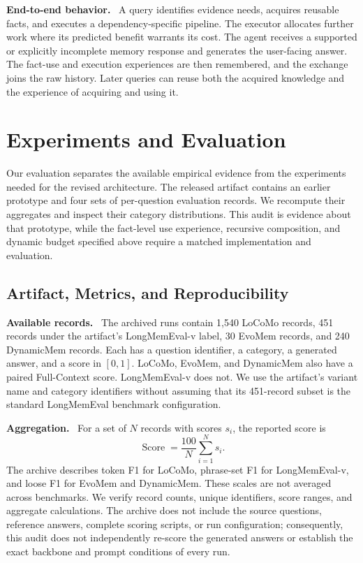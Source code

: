\documentclass[10pt,twocolumn]{article}
\newcommand{\runin}[1]{\smallskip\noindent\textbf{#1.}\ }
\begin{document}
\runin{End-to-end behavior}
A query identifies evidence needs, acquires reusable facts, and executes
a dependency-specific pipeline. The executor allocates further work
where its predicted benefit warrants its cost. The agent receives a
supported or explicitly incomplete memory response and generates the
user-facing answer. The fact-use and execution experiences are then
remembered, and the exchange joins the raw history. Later queries can
reuse both the acquired knowledge and the experience of acquiring and
using it.

\section{Experiments and Evaluation}
\label{sec:new-experiments}

Our evaluation separates the available empirical evidence from the
experiments needed for the revised architecture. The released artifact
contains an earlier prototype and four sets of per-question evaluation
records. We recompute their aggregates and inspect their category
distributions. This audit is evidence about that prototype, while the
fact-level use experience, recursive composition, and dynamic budget
specified above require a matched implementation and evaluation.

\subsection{Artifact, Metrics, and Reproducibility}
\label{subsec:new-artifact}

\runin{Available records}
The archived runs contain 1,540 LoCoMo records, 451 records under the
artifact's LongMemEval-v label, 30 EvoMem records, and 240 DynamicMem
records. Each has a question identifier, a category, a generated answer,
and a score in $[0,1]$. LoCoMo, EvoMem, and DynamicMem also have a
paired Full-Context score. LongMemEval-v does not. We use the artifact's
variant name and category identifiers without assuming that its
451-record subset is the standard LongMemEval benchmark configuration.

\runin{Aggregation}
For a set of $N$ records with scores $s_i$, the reported score is
\begin{equation}
\label{eq:new-score}
\operatorname{Score}=\frac{100}{N}\sum_{i=1}^{N}s_i.
\end{equation}
The archive describes token F1 for LoCoMo, phrase-set F1 for
LongMemEval-v, and loose F1 for EvoMem and DynamicMem. These scales are
not averaged across benchmarks. We verify record counts, unique
identifiers, score ranges, and aggregate calculations. The archive does
not include the source questions, reference answers, complete scoring
scripts, or run configuration; consequently, this audit does not
independently re-score the generated answers or establish the exact
backbone and prompt conditions of every run.
\end{document}
